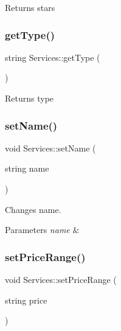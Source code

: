 \begin{DoxyReturn}{Returns}
stars 
\end{DoxyReturn}
\mbox{\label{class_services_af4da1cfed2bfabfc164d505993d105ce}} 
\subsubsection{\texorpdfstring{get\+Type()}{getType()}}
{\footnotesize\ttfamily string Services\+::get\+Type (\begin{DoxyParamCaption}{ }\end{DoxyParamCaption})\hspace{0.3cm}{\ttfamily [inline]}}

\begin{DoxyReturn}{Returns}
type 
\end{DoxyReturn}
\mbox{\label{class_services_a68e4ebe3d329da8ffd56cea463fb1c80}} 
\subsubsection{\texorpdfstring{set\+Name()}{setName()}}
{\footnotesize\ttfamily void Services\+::set\+Name (\begin{DoxyParamCaption}\item[{string}]{name }\end{DoxyParamCaption})\hspace{0.3cm}{\ttfamily [inline]}}

Changes name. 
\begin{DoxyParams}{Parameters}
{\em name} & \\
\hline
\end{DoxyParams}
\mbox{\label{class_services_a883f71c238f82e77c01f244ded84dd57}} 
\subsubsection{\texorpdfstring{set\+Price\+Range()}{setPriceRange()}}
{\footnotesize\ttfamily void Services\+::set\+Price\+Range (\begin{DoxyParamCaption}\item[{string}]{price }\end{DoxyParamCaption})\hspace{0.3cm}{\ttfamily [inline]}}

